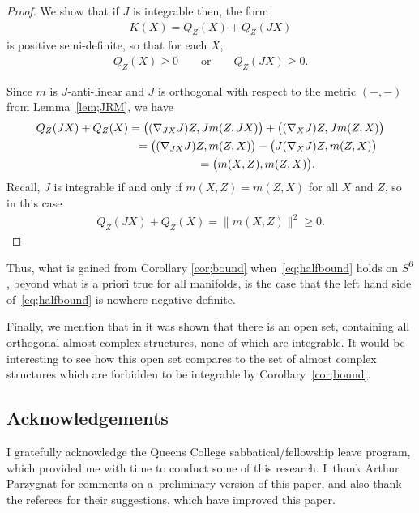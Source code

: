 \documentclass[pdftex]{sigma}
\numberwithin{equation}{section}
\begin{document}
\begin{proof} We show that if $J$ is integrable then, the form
 \begin{gather*}
 K(X) = Q_Z(X)+ Q_Z(JX)
 \end{gather*}
 is positive semi-definite, so that for each $X$,
 \begin{gather*}
 Q_Z(X) \geq 0 \qquad \textrm{or} \qquad Q_Z(JX) \geq 0.
 \end{gather*}

Since $m$ is $J$-anti-linear and $J$ is orthogonal with respect to the metric $( - , - )$ from Lemma~\ref{lem;JRM}, we have
\begin{gather*}
Q_Z(JX) + Q_Z(X) = \big( (\nabla_{JX} J) Z, J m(Z,JX) \big) + \big( (\nabla_X J) Z, J m(Z,X) \big) \\
\hphantom{Q_Z(JX) + Q_Z(X)}{} = \big( (\nabla_{JX} J) Z, m(Z,X) \big) - \big( J (\nabla_X J) Z, m(Z,X) \big)\\
\hphantom{Q_Z(JX) + Q_Z(X)}{}= \big( m(X,Z) , m(Z,X) \big).
\end{gather*}
Recall, $J$ is integrable if and only if $m(X,Z) = m(Z,X)$ for all $X$ and $Z$, so in this case
\begin{gather*}
Q_Z(JX) + Q_Z(X) = \| m(X,Z) \|^2 \geq 0. \tag*{\qed}
\end{gather*} \renewcommand{\qed}{}
\end{proof}

Thus, what is gained from Corollary \ref{cor;bound} when~\eqref{eq;halfbound} holds on $S^6$, beyond what is a priori true for all manifolds, is the case that the left hand side of~\eqref{eq;halfbound} is nowhere negative definite.

 Finally, we mention that in \cite{BHL} it was shown that there is an open set, containing all orthogonal almost complex structures, none of which are integrable. It would be interesting to see how this open set compares to the set of almost complex structures which are forbidden to be integrable by Corollary~\ref{cor;bound}.

\subsection*{Acknowledgements}
 I gratefully acknowledge the Queens College sabbatical/fellowship leave program, which provided me with time to conduct some of this research. I~thank Arthur Parzygnat for comments on a~preliminary version of this paper, and also thank the referees for their suggestions, which have improved this paper.
\end{document}
